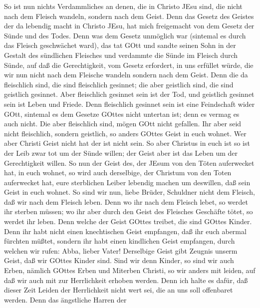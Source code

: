  So ist nun nichts Verdammliches an denen, die in Christo
JEsu sind, die nicht nach dem Fleisch wandeln, sondern nach dem Geist.
 Denn das Gesetz des Geistes der da lebendig macht in
Christo JEsu, hat mich freigemacht von dem Gesetz der Sünde und des
Todes.  Denn was dem Gesetz unmöglich war (sintemal es durch
das Fleisch geschwächet ward), das tat GOtt und sandte seinen Sohn in
der Gestalt des sündlichen Fleisches und verdammte die Sünde im Fleisch
durch Sünde,  auf daß die Gerechtigkeit, vom Gesetz
erfordert, in uns erfüllet würde, die wir nun nicht nach dem Fleische
wandeln sondern nach dem Geist.  Denn die da fleischlich
sind, die sind fleischlich gesinnet; die aber geistlich sind, die sind
geistlich gesinnet.  Aber fleischlich gesinnet sein ist der
Tod, und geistlich gesinnet sein ist Leben und Friede.  Denn
fleischlich gesinnet sein ist eine Feindschaft wider GOtt, sintemal es
dem Gesetze GOttes nicht untertan ist; denn es vermag es auch nicht.
 Die aber fleischlich sind, mögen GOtt nicht gefallen.
 Ihr aber seid nicht fleischlich, sondern geistlich, so
anders GOttes Geist in euch wohnet. Wer aber Christi Geist nicht hat der
ist nicht sein.  So aber Christus in euch ist so ist der
Leib zwar tot um der Sünde willen; der Geist aber ist das Leben um der
Gerechtigkeit willen.  So nun der Geist des, der JEsum von
den Töten auferwecket hat, in euch wohnet, so wird auch derselbige, der
Christum von den Toten auferwecket hat, eure sterblichen Leiber lebendig
machen um deswillen, daß sein Geist in euch wohnet.  So
sind wir nun, liebe Brüder, Schuldner nicht dem Fleisch, daß wir nach
dem Fleisch leben.  Denn wo ihr nach dem Fleisch lebet, so
werdet ihr sterben müssen; wo ihr aber durch den Geist des Fleisches
Geschäfte tötet, so werdet ihr leben.  Denn welche der
Geist GOttes treibet, die sind GOttes Kinder.  Denn ihr
habt nicht einen knechtischen Geist empfangen, daß ihr euch abermal
fürchten müßtet, sondern ihr habt einen kindlichen Geist empfangen,
durch welchen wir rufen: Abba, lieber Vater!  Derselbige
Geist gibt Zeugnis unserm Geist, daß wir GOttes Kinder sind.
 Sind wir denn Kinder, so sind wir auch Erben, nämlich
GOttes Erben und Miterben Christi, so wir anders mit leiden, auf daß wir
auch mit zur Herrlichkeit erhoben werden.  Denn ich halte
es dafür, daß dieser Zeit Leiden der Herrlichkeit nicht wert sei, die an
uns soll offenbaret werden.  Denn das ängstliche Harren der
